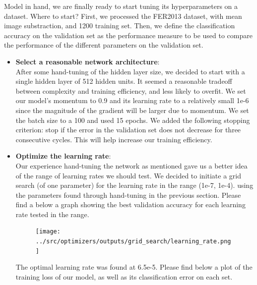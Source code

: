 Model in hand, we are finally ready to start tuning its hyperparameters on a dataset.
Where to start?
First, we processed the FER2013 dataset, with mean image substraction, and 1200 training set.
Then, we define the classification accuracy on the validation set as
the performance measure to be used to compare the performance of the different parameters on the validation set.

\begin{itemize}[topsep=-13pt]
\item \textbf{Select a reasonable network architecture}:\\
  After some hand-tuning of the hidden layer size, we decided to start with a single hidden layer of 512 hidden units.
  It seemed a reasonable tradeoff between complexity and training efficiency, and less likely to overfit.
  We set our model's momentum to 0.9 and its learning rate to a relatively small 1e-6
  since the magnitude of the gradient will be larger due to momentum.
  We set the batch size to a 100 and used 15 epochs.
  We added the following stopping criterion: stop if the error in the validation set does not decrease for three consecutive cycles.
  This will help increase our training efficiency.

\item \textbf{Optimize the learning rate}:\\
  Our experience hand-tuning the network as mentioned gave us a better idea of the range of learning rates we should test.
  We decided to initiate a grid search (of one parameter) for the learning rate in the range (1e-7, 1e-4).
  using the parameters found through hand-tuning in the previous section.
  Please find a below a graph showing the best validation accuracy for each learning rate tested in the range.
  \begin{figure}[!ht]
      \centering
      {{\texttt{[image: ../src/optimizers/outputs/grid\_search/learning\_rate.png]}}}
  \end{figure}

  The optimal learning rate was found at 6.5e-5.
  Please find below a plot of the training loss of our model, as well as its classification error on each set.
  


\end{itemize}

